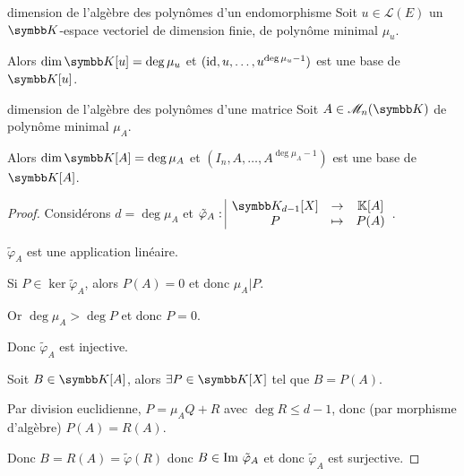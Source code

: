 \begin{theorement}{dimension de l'algèbre des polynômes d'un endomorphisme}{}
    Soit $u \in \mathscr L(E)$ un $\K$-espace vectoriel de dimension finie, 
    de polynôme minimal $\mu_u$. 

    Alors $\dim \K[u] = \deg \mu_u$ et $(\operatorname{id}, u, \ldots, u^{\deg \mu_u - 1})$ est une base de $\K[u]$.
\end{theorement}

\begin{theorement}{dimension de l'algèbre des polynômes d'une matrice}{}
    Soit $A \in \mathscr M_n(\K)$ de polynôme minimal $\mu_A$.

    Alors $\dim \K[A] = \deg \mu_A$ et $(I_n, A, \ldots, A^{\deg \mu_A - 1})$ est une base de $\K[A]$.
\end{theorement}

\begin{proof}
    Considérons $d = \deg \mu_A$ et $\fonction{\tilde \varphi_A}{\K_{d - 1}[X]}{\mathbb K[A]}{P}{P(A)}$.

    $\tilde \varphi_A$ est une application linéaire. 

    Si $P \in \ker \tilde \varphi_A$, alors $P(A) = 0$ et donc $\mu_A | P$.

    Or $\deg \mu_A > \deg P$ et donc $P = 0$.

    Donc $\tilde \varphi_A$ est injective.

    \avspace Soit $B \in \K [A]$, alors $\exists P \in \K[X]$ tel que $B = P(A)$.

    Par division euclidienne, $P = \mu_A Q + R$ avec $\deg R \leqslant d - 1$, donc 
    (par morphisme d'algèbre) $P(A) = R(A)$.

    Donc $B = R(A) = \tilde \varphi(R)$ donc $B \in \operatorname{Im} \, \tilde \varphi_A$ et donc 
    $\tilde \varphi_A$ est surjective.
\end{proof}

